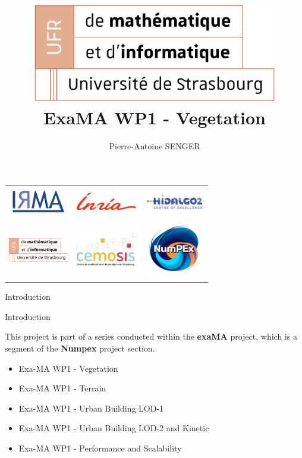 \documentclass[10pt]{beamer}
\title[ExaMA WP1 Vegetation]{
  \includegraphics[width=0.8\textwidth]{images/logo-ufr.png}
  ExaMA WP1 - Vegetation}
\author[PA Senger]{Pierre-Antoine SENGER}
\begin{document}
\begin{frame}[plain]
    \begin{center}
    \begin{tabular}{c c c}
    \includegraphics[width=100px]{images/logo-irma.png} &
    \includegraphics[width=100px]{images/logo-inria.png} &
    \includegraphics[width=100px]{images/logo-hidalgo2.png} \\
    \includegraphics[width=100px]{images/logo-ufr.png} &
    \includegraphics[width=100px]{images/logo-cemosis.png} &
    \includegraphics[width=100px]{images/logo-numpex.png} \\
    \end{tabular}
    \end{center}
\end{frame}

\begin{frame}{Introduction}
  \titlepage
\end{frame}

\begin{frame}{Introduction}

	This project is part of a series conducted within the \textbf{exaMA} project,
	which is a segment of the \textbf{Numpex} project section.

	\vspace{1em}

	\begin{itemize}
		\item Exa-MA WP1 - Vegetation
		\item Exa-MA WP1 - Terrain
		\item Exa-MA WP1 - Urban Building LOD-1
		\item Exa-MA WP1 - Urban Building LOD-2 and Kinetic
		\item Exa-MA WP1 - Performance and Scalability
	\end{itemize}
\end{frame}
\end{document}
